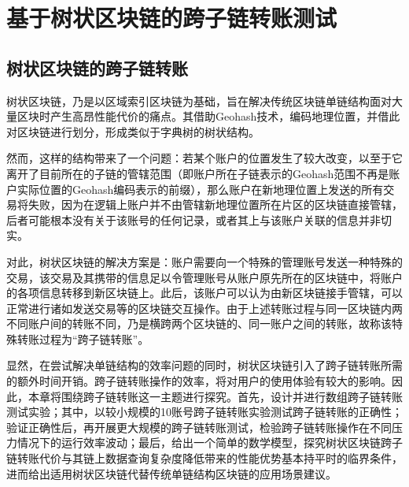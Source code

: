 %
%
%
%
%

\chapter{基于树状区块链的跨子链转账测试}

\section{树状区块链的跨子链转账}

树状区块链，乃是以区域索引区块链为基础，旨在解决传统区块链单链结构面对大量区块时产生高昂性能代价的痛点。其借助Geohash技术，编码地理位置，并借此对区块链进行划分，形成类似于字典树的树状结构。

然而，这样的结构带来了一个问题：若某个账户的位置发生了较大改变，以至于它离开了目前所在的子链的管辖范围（即账户所在子链表示的Geohash范围不再是账户实际位置的Geohash编码表示的前缀），那么账户在新地理位置上发送的所有交易将失败，因为在逻辑上账户并不由管辖新地理位置所在片区的区块链直接管辖，后者可能根本没有关于该账号的任何记录，或者其上与该账户关联的信息并非切实。

对此，树状区块链的解决方案是：账户需要向一个特殊的管理账号发送一种特殊的交易，该交易及其携带的信息足以令管理账号从账户原先所在的区块链中，将账户的各项信息转移到新区块链上。此后，该账户可以认为由新区块链接手管辖，可以正常进行诸如发送交易等的区块链交互操作。由于上述转账过程与同一区块链内两不同账户间的转账不同，乃是横跨两个区块链的、同一账户之间的转账，故称该特殊转账过程为“跨子链转账”。

显然，在尝试解决单链结构的效率问题的同时，树状区块链引入了跨子链转账所需的额外时间开销。跨子链转账操作的效率，将对用户的使用体验有较大的影响。因此，本章将围绕跨子链转账这一主题进行探究。首先，设计并进行数组跨子链转账测试实验；其中，以较小规模的10账号跨子链转账实验测试跨子链转账的正确性；验证正确性后，再开展更大规模的跨子链转账测试，检验跨子链转账操作在不同压力情况下的运行效率波动；最后，给出一个简单的数学模型，探究树状区块链跨子链转账代价与其链上数据查询复杂度降低带来的性能优势基本持平时的临界条件，进而给出适用树状区块链代替传统单链结构区块链的应用场景建议。

